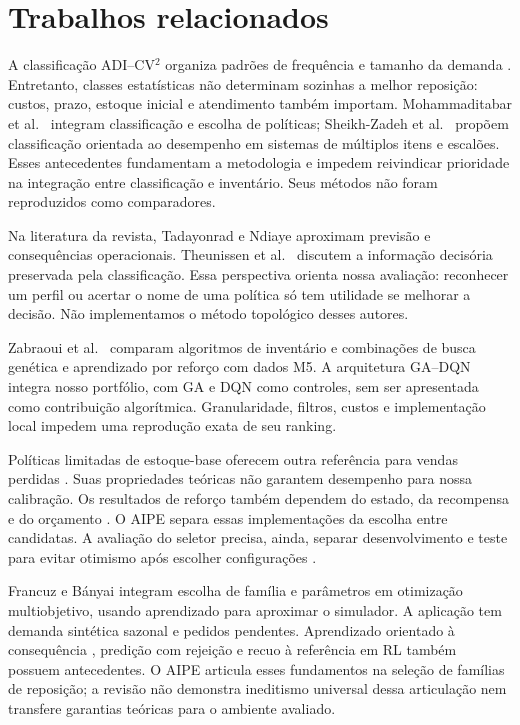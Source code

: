 \documentclass[preprint,12pt]{elsarticle}
\begin{document}
\section{Trabalhos relacionados}
A classificação ADI--CV$^2$ organiza padrões de frequência e tamanho da demanda \cite{syntetos2005}. Entretanto, classes estatísticas não determinam sozinhas a melhor reposição: custos, prazo, estoque inicial e atendimento também importam. Mohammaditabar et al.\ \cite{Mohammaditabar2012Integrated} integram classificação e escolha de políticas; Sheikh-Zadeh et al.\ \cite{SheikhZadeh2021PBIC} propõem classificação orientada ao desempenho em sistemas de múltiplos itens e escalões. Esses antecedentes fundamentam a metodologia e impedem reivindicar prioridade na integração entre classificação e inventário. Seus métodos não foram reproduzidos como comparadores.

Na literatura da revista, Tadayonrad e Ndiaye \cite{sca_f81ad2b3e023} aproximam previsão e consequências operacionais. Theunissen et al.\ \cite{sca_c5c06dcbc9e5} discutem a informação decisória preservada pela classificação. Essa perspectiva orienta nossa avaliação: reconhecer um perfil ou acertar o nome de uma política só tem utilidade se melhorar a decisão. Não implementamos o método topológico desses autores.

Zabraoui et al.\ \cite{sca_27e994c54848} comparam algoritmos de inventário e combinações de busca genética e aprendizado por reforço com dados M5. A arquitetura GA--DQN integra nosso portfólio, com GA e DQN como controles, sem ser apresentada como contribuição algorítmica. Granularidade, filtros, custos e implementação local impedem uma reprodução exata de seu ranking.

Políticas limitadas de estoque-base oferecem outra referência para vendas perdidas \cite{Xin2021CappedBaseStock}. Suas propriedades teóricas não garantem desempenho para nossa calibração. Os resultados de reforço também dependem do estado, da recompensa e do orçamento \cite{Boute2022DRLInventoryRoadmap}. O AIPE separa essas implementações da escolha entre candidatas. A avaliação do seletor precisa, ainda, separar desenvolvimento e teste para evitar otimismo após escolher configurações \cite{CawleyTalbot2010}.

Francuz e Bányai \cite{FrancuzBanyai2026Selection} integram escolha de família e parâmetros em otimização multiobjetivo, usando aprendizado para aproximar o simulador. A aplicação tem demanda sintética sazonal e pedidos pendentes. Aprendizado orientado à consequência \cite{ElmachtoubGrigas2022SPO}, predição com rejeição \cite{GeifmanElYaniv2019SelectiveNet} e recuo à referência em RL \cite{Laroche2019SPIBB} também possuem antecedentes. O AIPE articula esses fundamentos na seleção de famílias de reposição; a revisão não demonstra ineditismo universal dessa articulação nem transfere garantias teóricas para o ambiente avaliado.
\end{document}
